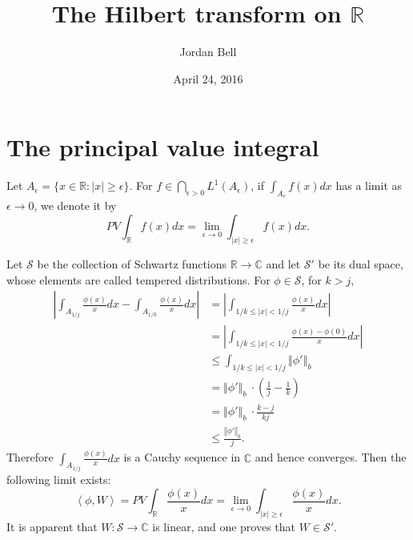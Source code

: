 \documentclass{article}
\newcommand{\inner}[2]{\left\langle #1, #2 \right\rangle}
\newcommand{\norm}[1]{\left\Vert #1 \right\Vert}
\theoremstyle{definition}
\begin{document}
\title{The Hilbert transform on $\mathbb{R}$}
\author{Jordan Bell}
\date{April 24, 2016}

\maketitle


\section{The principal value integral}
Let $A_\epsilon=\{x \in \mathbb{R}: |x| \geq \epsilon\}$. For $f \in \bigcap_{\epsilon>0} L^1(A_\epsilon)$, 
if $\int_{A_\epsilon}  f(x) dx$ has a limit as $\epsilon \to 0$, we denote it by
\[
PV \int_{\mathbb{R}} f(x) dx = \lim_{\epsilon \to 0} \int_{|x| \geq \epsilon} f(x) dx.
\]

Let $\mathscr{S}$ be the collection of Schwartz functions $\mathbb{R} \to \mathbb{C}$ and let
$\mathscr{S}'$ be its dual space, whose elements are called tempered distributions.
For $\phi \in \mathscr{S}$, for $k>j$,
\begin{align*}
\left| \int_{A_{1/j}}  \frac{\phi(x)}{x} dx - \int_{A_{1/k}} \frac{\phi(x)}{x} dx\right|&=\left| \int_{1/k \leq |x| < 1/j} \frac{\phi(x)}{x} dx \right|\\
&=\left| \int_{1/k \leq |x| < 1/j} \frac{\phi(x)-\phi(0)}{x} dx \right|\\
&\leq \int_{1/k \leq |x| < 1/j} \norm{\phi'}_b\\
&=\norm{\phi'}_b\ \cdot \left( \frac{1}{j}-\frac{1}{k} \right)\\
&=\norm{\phi'}_b\ \cdot \frac{k-j}{kj}\\
&\leq \frac{\norm{\phi'}_b}{j}.
\end{align*}
Therefore $\int_{A_{1/j}} \frac{\phi(x)}{x} dx$ is a Cauchy sequence in $\mathbb{C}$ and hence
converges.
Then the following limit exists:
\[
\inner{\phi}{W}=PV \int_{\mathbb{R}} \frac{\phi(x)}{x} dx = \lim_{\epsilon \to 0} \int_{|x| \geq \epsilon} \frac{\phi(x)}{x} dx.
\]
It is apparent that $W:\mathscr{S} \to \mathbb{C}$ is linear, and
one proves that
$W \in \mathscr{S}'$.
\end{document}
